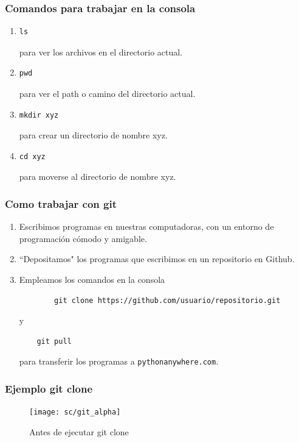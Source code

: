 \documentclass[11pt]{beamer}
\begin{document}
\begin{frame}[fragile]
	\frametitle{Comandos para trabajar en la consola}
	
\begin{enumerate}
	\item \begin{verbatim}ls\end{verbatim} para ver los archivos en el directorio actual.
	\item \begin{verbatim}pwd\end{verbatim} para ver el path o camino del directorio actual.
	\item \begin{verbatim}mkdir xyz\end{verbatim} para crear un directorio de nombre xyz.
	\item \begin{verbatim}cd xyz\end{verbatim} para moverse al directorio de nombre xyz.
\end{enumerate}
\end{frame}

\begin{frame}[fragile]
	\frametitle{Como trabajar con git}
	
\begin{enumerate}
	\item Escribimos programas en nuestras computadoras, con un entorno de programación cómodo y amigable.
	\item ``Depositamos" los programas que escribimos en un repositorio en Github.
	\item Empleamos los comandos en la consola
	\begin{verbatim}
		git clone https://github.com/usuario/repositorio.git
	\end{verbatim}
    y
	\begin{verbatim}
	git pull
    \end{verbatim}
    para transferir los programas a \verb-pythonanywhere.com-.
	
\end{enumerate}
\end{frame}

\begin{frame}
	\frametitle{Ejemplo git clone}
	\begin{figure}
		\centering
		\texttt{[image: sc/git\_alpha]}
		\caption{Antes de ejecutar git clone}
	\end{figure}
	
\end{frame}
\end{document}
